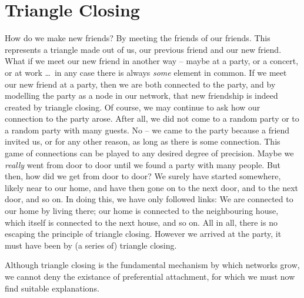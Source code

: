 \documentclass{acm_proc_article-sp}
\begin{document}
\section{Triangle Closing}
How do we make new friends?  By meeting the friends of our friends.
This represents a triangle made out of us, our previous friend and our
new friend.  What if we meet our new friend in another way -- maybe at a
party, or a concert, or at work \ldots\ in any case there is always
\emph{some} element in common. If we meet our new friend at a party, then
we are both connected to the party, and by modelling the party as a node
in our network, that new friendship is indeed created by triangle
closing. Of course, we may continue to ask how our connection to the party
arose.  After all, we did not come to a random party or to a
random party with many guests.  No -- we came to the party because a
friend invited us, or for any other reason, as long as there is some
connection.  This game of connections can be played to any
desired degree of precision.  Maybe we \emph{really} went from door to
door until we found a party with many people.  But then, how did we get
from door to door?  We surely have started somewhere, likely near to our
home, and have then gone on to the next door, and to the next door, and
so on.  In doing this, we have only followed links:  We are connected to
our home by living there;  our home is connected to the neighbouring
house, which itself is connected to the next house, and so on.  All in
all, there is no escaping the principle of triangle closing.  However we
arrived at the party, it must have been by (a series of) triangle
closing.  

Although triangle closing is the fundamental mechanism by which networks
grow, we cannot deny the existance of preferential attachment, for which
we must now find suitable explanations. 
\end{document}
